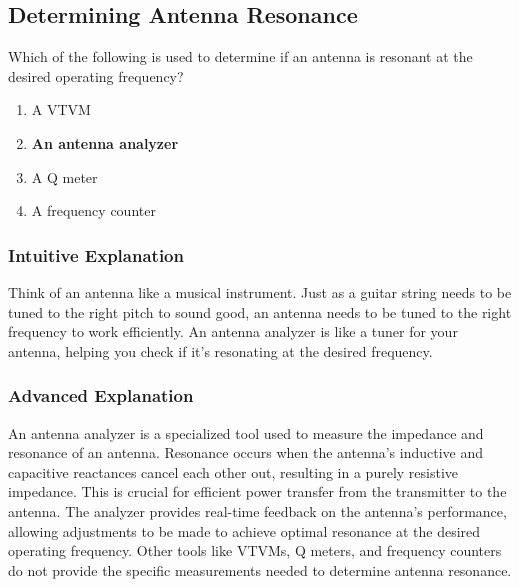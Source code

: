 \subsection{Determining Antenna Resonance}
\label{T7C02}

\begin{tcolorbox}[colback=gray!10!white,colframe=black!75!black,title=T7C02]
Which of the following is used to determine if an antenna is resonant at the desired operating frequency?
\begin{enumerate}[noitemsep]
    \item A VTVM
    \item \textbf{An antenna analyzer}
    \item A Q meter
    \item A frequency counter
\end{enumerate}
\end{tcolorbox}

\subsubsection*{Intuitive Explanation}
Think of an antenna like a musical instrument. Just as a guitar string needs to be tuned to the right pitch to sound good, an antenna needs to be tuned to the right frequency to work efficiently. An antenna analyzer is like a tuner for your antenna, helping you check if it's resonating at the desired frequency.

\subsubsection*{Advanced Explanation}
An antenna analyzer is a specialized tool used to measure the impedance and resonance of an antenna. Resonance occurs when the antenna's inductive and capacitive reactances cancel each other out, resulting in a purely resistive impedance. This is crucial for efficient power transfer from the transmitter to the antenna. The analyzer provides real-time feedback on the antenna's performance, allowing adjustments to be made to achieve optimal resonance at the desired operating frequency. Other tools like VTVMs, Q meters, and frequency counters do not provide the specific measurements needed to determine antenna resonance.